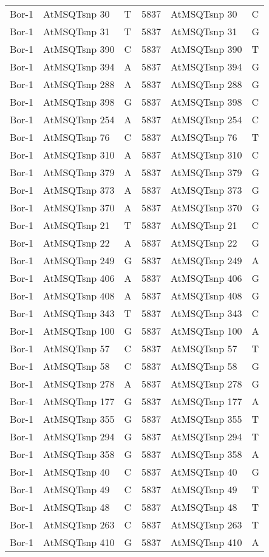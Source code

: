 \begin{center}
\begin{longtable}{|l|l|l|l|l|l|}
Bor-1&AtMSQTsnp 30&T&5837&AtMSQTsnp 30&C\\
Bor-1&AtMSQTsnp 31&T&5837&AtMSQTsnp 31&G\\
Bor-1&AtMSQTsnp 390&C&5837&AtMSQTsnp 390&T\\
Bor-1&AtMSQTsnp 394&A&5837&AtMSQTsnp 394&G\\
Bor-1&AtMSQTsnp 288&A&5837&AtMSQTsnp 288&G\\
Bor-1&AtMSQTsnp 398&G&5837&AtMSQTsnp 398&C\\
Bor-1&AtMSQTsnp 254&A&5837&AtMSQTsnp 254&C\\
Bor-1&AtMSQTsnp 76&C&5837&AtMSQTsnp 76&T\\
Bor-1&AtMSQTsnp 310&A&5837&AtMSQTsnp 310&C\\
Bor-1&AtMSQTsnp 379&A&5837&AtMSQTsnp 379&G\\
Bor-1&AtMSQTsnp 373&A&5837&AtMSQTsnp 373&G\\
Bor-1&AtMSQTsnp 370&A&5837&AtMSQTsnp 370&G\\
Bor-1&AtMSQTsnp 21&T&5837&AtMSQTsnp 21&C\\
Bor-1&AtMSQTsnp 22&A&5837&AtMSQTsnp 22&G\\
Bor-1&AtMSQTsnp 249&G&5837&AtMSQTsnp 249&A\\
Bor-1&AtMSQTsnp 406&A&5837&AtMSQTsnp 406&G\\
Bor-1&AtMSQTsnp 408&A&5837&AtMSQTsnp 408&G\\
Bor-1&AtMSQTsnp 343&T&5837&AtMSQTsnp 343&C\\
Bor-1&AtMSQTsnp 100&G&5837&AtMSQTsnp 100&A\\
Bor-1&AtMSQTsnp 57&C&5837&AtMSQTsnp 57&T\\
Bor-1&AtMSQTsnp 58&C&5837&AtMSQTsnp 58&G\\
Bor-1&AtMSQTsnp 278&A&5837&AtMSQTsnp 278&G\\
Bor-1&AtMSQTsnp 177&G&5837&AtMSQTsnp 177&A\\
Bor-1&AtMSQTsnp 355&G&5837&AtMSQTsnp 355&T\\
Bor-1&AtMSQTsnp 294&G&5837&AtMSQTsnp 294&T\\
Bor-1&AtMSQTsnp 358&G&5837&AtMSQTsnp 358&A\\
Bor-1&AtMSQTsnp 40&C&5837&AtMSQTsnp 40&G\\
Bor-1&AtMSQTsnp 49&C&5837&AtMSQTsnp 49&T\\
Bor-1&AtMSQTsnp 48&C&5837&AtMSQTsnp 48&T\\
Bor-1&AtMSQTsnp 263&C&5837&AtMSQTsnp 263&T\\
Bor-1&AtMSQTsnp 410&G&5837&AtMSQTsnp 410&A\\

\end{longtable}
\end{center}
